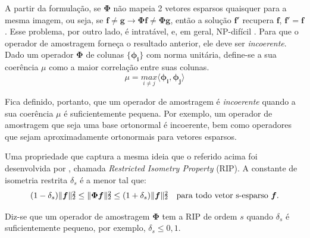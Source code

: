 \documentclass[cic,tc]{iiufrgs}
\def\SPSB#1#2{\rlap{\textsuperscript{#1}}\SB{#2}}
\def\SB#1{\textsubscript{#1}}
\renewcommand{\vec}[1]{\bm{#1}}
\begin{document}
A partir da formulação, se $\mathbf{\Phi}$ não mapeia 2 vetores esparsos quaisquer para a mesma imagem, ou seja,
se $\vec{f} \ne \vec{g} \rightarrow \mathbf{\Phi}\vec{f} \ne \mathbf{\Phi}\vec{g} $, então a solução $\vec{f}'$ recupera
$\vec{f}$, $\vec{f}' = \vec{f}$ \cite{chen2015compressed}. Esse problema, por outro lado, é intratável, e, em geral,
NP-difícil \cite{Mut05}.
Para que o operador de amostragem forneça o resultado anterior, ele deve ser \textit{incoerente}.
Dado um operador $\mathbf{\Phi}$ de colunas $\{ \vec{\phi_i} \}$  com norma unitária, define-se a sua coerência $\mu$
como a maior correlação entre suas colunas.
\begin{equation}
    \label{eq:coerence}
    \mu = \underset{i \ne j}{max}\langle \vec{\phi_i} , \vec{\phi_j} \rangle
\end{equation}

Fica definido, portanto, que um operador de amostragem é \textit{incoerente} quando a sua coerência $\mu$ é 
suficientemente pequena. Por exemplo, um operador de amostragem que seja uma base ortonormal é incoerente, bem como
operadores que sejam aproximadamente ortonormais para vetores esparsos.

Uma propriedade que captura a mesma ideia que o referido acima foi desenvolvida por \citet{CandesSignalRecovery}, chamada 
\textit{Restricted Isometry Property} (RIP). A constante de isometria restrita 
$\delta_s$ é a menor tal que:
\begin{equation}
    \label{eq:rip}
    (1 - \delta_s)\lVert \vec{f} \rVert\SPSB{2}{2} \le \lVert \mathbf{\Phi} \vec{f} \rVert \SPSB{2}{2} \le 
    (1 + \delta_s)\lVert \vec{f} \rVert\SPSB{2}{2} \hspace{1em} \text{para todo vetor s-esparso } \vec{f}.
\end{equation}

Diz-se que um operador de amostragem $\mathbf{\Phi}$ tem a RIP de ordem $s$ quando $\delta_s$ é suficientemente
pequeno, por exemplo, $\delta_s \le 0,1$.
\end{document}
